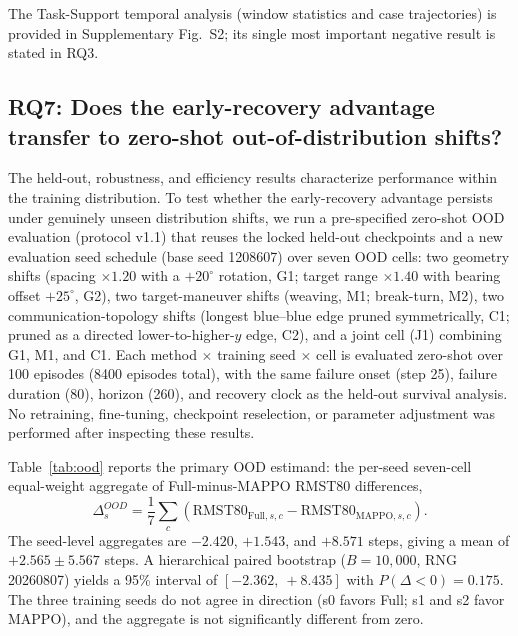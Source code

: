 The Task-Support temporal analysis (window statistics and case trajectories) is provided in Supplementary Fig.~S2; its single most important negative result is stated in RQ3.

\subsection{RQ7: Does the early-recovery advantage transfer to zero-shot out-of-distribution shifts?}

The held-out, robustness, and efficiency results characterize performance within the training distribution. To test whether the early-recovery advantage persists under genuinely unseen distribution shifts, we run a pre-specified zero-shot OOD evaluation (protocol v1.1) that reuses the locked held-out checkpoints and a new evaluation seed schedule (base seed 1208607) over seven OOD cells: two geometry shifts (spacing $\times 1.20$ with a $+20^{\circ}$ rotation, G1; target range $\times 1.40$ with bearing offset $+25^{\circ}$, G2), two target-maneuver shifts (weaving, M1; break-turn, M2), two communication-topology shifts (longest blue--blue edge pruned symmetrically, C1; pruned as a directed lower-to-higher-$y$ edge, C2), and a joint cell (J1) combining G1, M1, and C1. Each method $\times$ training seed $\times$ cell is evaluated zero-shot over 100 episodes (8400 episodes total), with the same failure onset (step 25), failure duration (80), horizon (260), and recovery clock as the held-out survival analysis. No retraining, fine-tuning, checkpoint reselection, or parameter adjustment was performed after inspecting these results.

Table~\ref{tab:ood} reports the primary OOD estimand: the per-seed seven-cell equal-weight aggregate of Full-minus-MAPPO RMST80 differences,
\begin{equation}
\Delta^{OOD}_s=\frac{1}{7}\sum_{c}\left(\mathrm{RMST80}_{\mathrm{Full},s,c}-\mathrm{RMST80}_{\mathrm{MAPPO},s,c}\right).
\label{eq:delta_ood}
\end{equation}
The seed-level aggregates are $-2.420$, $+1.543$, and $+8.571$ steps, giving a mean of $+2.565 \pm 5.567$ steps. A hierarchical paired bootstrap ($B=10{,}000$, RNG 20260807) yields a 95\% interval of $[-2.362,\ +8.435]$ with $P(\Delta<0)=0.175$. The three training seeds do not agree in direction (s0 favors Full; s1 and s2 favor MAPPO), and the aggregate is not significantly different from zero.

